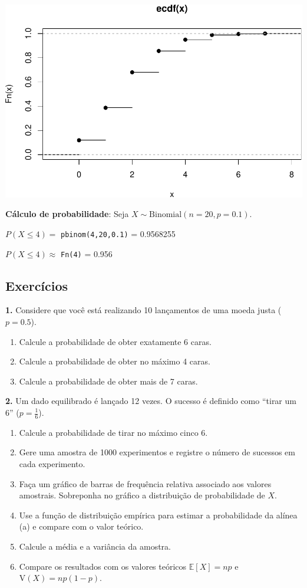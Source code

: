 \documentclass[
]{book}
\providecommand{\tightlist}{%
  \setlength{\itemsep}{0pt}\setlength{\parskip}{0pt}}
\begin{document}
\includegraphics{introR_files/figure-latex/unnamed-chunk-259-2.pdf}

\textbf{Cálculo de probabilidade}: Seja \(X \sim \text{Binomial}(n=20, p=0.1)\).

\(P(X \leq 4) =\) \texttt{pbinom(4,20,0.1)} = 0.9568255

\(P(X \leq 4) \approx\) \texttt{Fn(4)} = 0.956

\subsection{Exercícios}\label{exercuxedcios-25}

\textbf{1.} Considere que você está realizando 10 lançamentos de uma moeda justa (\(p = 0.5\)).

\begin{enumerate}
\def\labelenumi{(\alph{enumi})}
\tightlist
\item
  Calcule a probabilidade de obter exatamente 6 caras.
\item
  Calcule a probabilidade de obter no máximo 4 caras.
\item
  Calcule a probabilidade de obter mais de 7 caras.
\end{enumerate}

\textbf{2.} Um dado equilibrado é lançado 12 vezes. O sucesso é definido como ``tirar um 6'' (\(p = \frac{1}{6}\)).

\begin{enumerate}
\def\labelenumi{(\alph{enumi})}
\tightlist
\item
  Calcule a probabilidade de tirar no máximo cinco 6.
\item
  Gere uma amostra de 1000 experimentos e registre o número de sucessos em cada experimento.
\item
  Faça um gráfico de barras de frequência relativa associado aos valores amostrais. Sobreponha no gráfico a distribuição de probabilidade de \(X\).
\item
  Use a função de distribuição empírica para estimar a probabilidade da alínea (a) e compare com o valor teórico.
\item
  Calcule a média e a variância da amostra.
\item
  Compare os resultados com os valores teóricos \(\mathbb{E}[X] = np\) e \(\text{V}(X) = np(1-p)\).
\end{enumerate}
\end{document}
